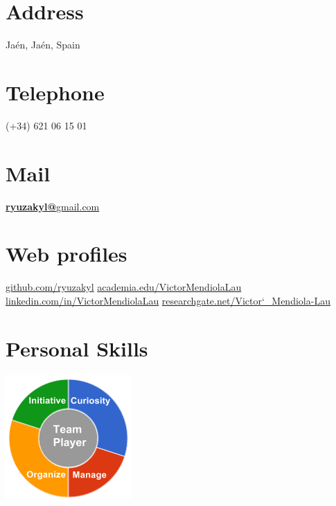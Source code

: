 \documentclass[]{friggeri-cv}
\begin{document}
      

\begin{aside}
  \section{Address}
    Jaén, Jaén, Spain
    ~
    ~
    ~
  \section{Telephone}
    (+34) 621 06 15 01
    ~
    ~
    ~
  \section{Mail}
    \href{mailto:ryuzakyl@gmail.com}{\textbf{ryuzakyl@}gmail.com}
	~
	~    
    ~
  \section{Web profiles}
    \href{https://github.com/ryuzakyl}{{\scriptsize github.com/ryuzakyl}}
    \href{https://independent.academia.edu/VictorMendiolaLau}{{\scriptsize academia.edu/VictorMendiolaLau}}
    \href{https://www.linkedin.com/in/VictorMendiolaLau}{{\scriptsize linkedin.com/in/VictorMendiolaLau}}
	\href{https://www.researchgate.net/profile/Victor_Mendiola-Lau}{{\scriptsize researchgate.net/Victor\char`_Mendiola-Lau}}
    ~
    ~
    ~
  \section{Personal Skills}
    \includegraphics[scale=0.62]{img/personal.png}
    ~
\end{aside}
\end{document}
